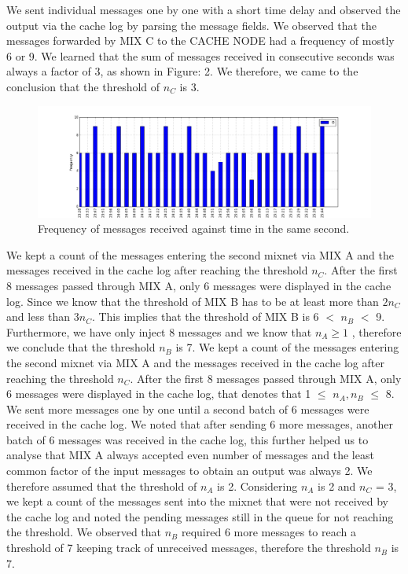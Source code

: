 \documentclass[preprint,12pt,3p]{elsarticle}
\begin{document}
\begin{flushleft}
We sent individual messages one by one with a short time delay and observed the output via the cache log by parsing the message fields. We observed that the messages forwarded by MIX C to the CACHE NODE had a frequency of mostly 6 or 9. We learned that the sum of messages received in consecutive seconds was always a factor of 3, as shown in Figure: 2. We therefore, we came to the conclusion that the threshold of $n_C$ is 3.
\newline
\begin{figure}[h]
\caption{Frequency of messages received against time in the same second.}
\centering
\includegraphics[width=\textwidth]{second}
\end{figure}
\newline
We kept a count of the messages entering the second mixnet via MIX A and the messages received in the cache log after reaching the threshold $n_C$. After the first 8 messages passed through MIX A, only 6 messages were displayed in the cache log. Since we know that the threshold of MIX B has to be at least more than $2n_C$ and less than $3n_C$. This implies that the threshold of MIX B is 6 $<$ $n_B$ $<$ 9. Furthermore, we have only inject 8 messages and we know that $n_A\geq 1$ , therefore we conclude that the threshold $n_B$ is 7. 
\newline
We kept a count of the messages entering the second mixnet via MIX A and the messages received in the cache log after reaching the threshold $n_C$. After the first 8 messages passed through MIX A, only 6 messages were displayed in the cache log, that denotes that 1 $\leq$ $n_A, n_B$ $\leq$ 8. We sent more messages one by one until a second batch of 6 messages were received in the cache log. We noted that after sending 6 more messages, another batch of 6 messages was received in the cache log, this further helped us to analyse that MIX A always accepted even number of messages and the least common factor of the input messages to obtain an output was always 2. We therefore assumed that the threshold of  $n_A$ is 2. 
\newline
\newline
Considering $n_A$ is 2 and $n_C$ = 3, we kept a count of the messages sent into the mixnet that were not received by the cache log and noted the pending messages still in the queue for not reaching the threshold. We observed that $n_B$ required 6 more messages to reach a threshold of 7 keeping  track of unreceived messages, therefore the threshold $n_B$ is 7. 
\newline



\end{flushleft}
\end{document}
